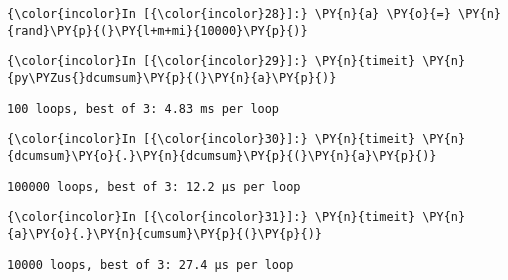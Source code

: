     \begin{Verbatim}[commandchars=\\\{\}]
{\color{incolor}In [{\color{incolor}28}]:} \PY{n}{a} \PY{o}{=} \PY{n}{rand}\PY{p}{(}\PY{l+m+mi}{10000}\PY{p}{)}
\end{Verbatim}

    \begin{Verbatim}[commandchars=\\\{\}]
{\color{incolor}In [{\color{incolor}29}]:} \PY{n}{timeit} \PY{n}{py\PYZus{}dcumsum}\PY{p}{(}\PY{n}{a}\PY{p}{)}
\end{Verbatim}

    \begin{Verbatim}[commandchars=\\\{\}]
100 loops, best of 3: 4.83 ms per loop

    \end{Verbatim}

    \begin{Verbatim}[commandchars=\\\{\}]
{\color{incolor}In [{\color{incolor}30}]:} \PY{n}{timeit} \PY{n}{dcumsum}\PY{o}{.}\PY{n}{dcumsum}\PY{p}{(}\PY{n}{a}\PY{p}{)}
\end{Verbatim}

    \begin{Verbatim}[commandchars=\\\{\}]
100000 loops, best of 3: 12.2 µs per loop

    \end{Verbatim}

    \begin{Verbatim}[commandchars=\\\{\}]
{\color{incolor}In [{\color{incolor}31}]:} \PY{n}{timeit} \PY{n}{a}\PY{o}{.}\PY{n}{cumsum}\PY{p}{(}\PY{p}{)}
\end{Verbatim}

    \begin{Verbatim}[commandchars=\\\{\}]
10000 loops, best of 3: 27.4 µs per loop

    \end{Verbatim}











